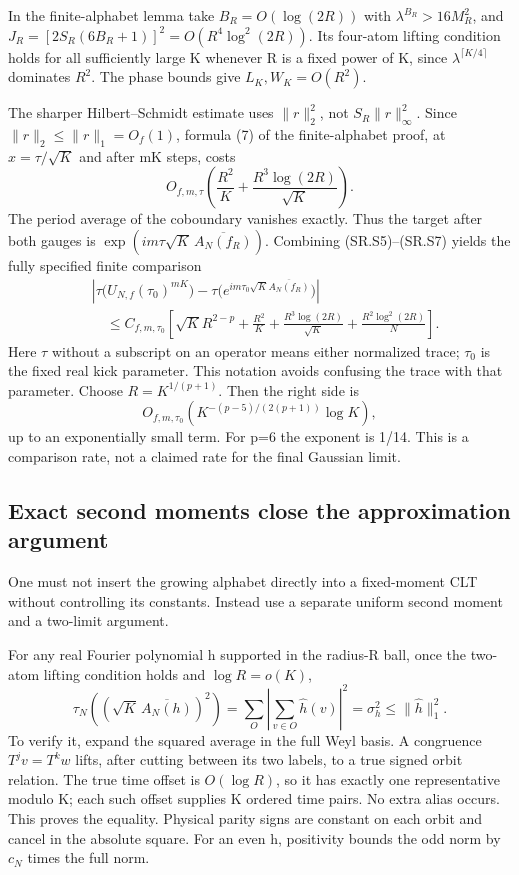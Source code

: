 In the finite-alphabet lemma take \(B_R=O(\log(2R))\) with \(\lambda^{B_R}>16M_R^2\), and \(J_R=[2S_R(6B_R+1)]^2=O(R^4\log^2(2R))\). Its four-atom lifting condition holds for all sufficiently large K whenever R is a fixed power of K, since \(\lambda^{\lceil K/4\rceil}\) dominates \(R^2\). The phase bounds give \(L_K,W_K=O(R^2)\).

The sharper Hilbert--Schmidt estimate uses \(\|r\|_2^2\), not \(S_R\|r\|_\infty^2\). Since \(\|r\|_2\leq\|r\|_1=O_f(1)\), formula (7) of the finite-alphabet proof, at \(x=\tau/\sqrt K\) and after mK steps, costs \[
 O_{f,m,\tau}\left(\frac{R^2}{K}+
                         \frac{R^3\log(2R)}{\sqrt K}\right). \tag{SR.S7}
\] The period average of the coboundary vanishes exactly. Thus the target after both gauges is \(\exp(i m\tau\sqrt K\,\overline {A_N(f_R)})\). Combining (SR.S5)--(SR.S7) yields the fully specified finite comparison \[
 \begin{split}
 &\left|\tau\bigl(U_{N,f}(\tau_0)^{mK}\bigr)
       -\tau\bigl(e^{im\tau_0\sqrt K\overline {A_N(f_R)}}\bigr)\right|\\
 &\quad\leq C_{f,m,\tau_0}\left[
 \sqrt K R^{2-p}+\frac{R^2}{K}+\frac{R^3\log(2R)}{\sqrt K}
                       +\frac{R^2\log^2(2R)}N\right].
 \end{split} \tag{SR.S8}
\] Here \(\tau\) without a subscript on an operator means either normalized trace; \(\tau_{0}\) is the fixed real kick parameter. This notation avoids confusing the trace with that parameter. Choose \(R=K^{1/(p+1)}\). Then the right side is \[
 O_{f,m,\tau_0}\left(K^{-(p-5)/(2(p+1))}\log K\right),         \tag{SR.S9}
\] up to an exponentially small term. For p=6 the exponent is 1/14. This is a comparison rate, not a claimed rate for the final Gaussian limit.

\subsection{Exact second moments close the approximation argument}\label{smooth:exact-second-moments-close-the-approximation-argument}

One must not insert the growing alphabet directly into a fixed-moment CLT without controlling its constants. Instead use a separate uniform second moment and a two-limit argument.

For any real Fourier polynomial h supported in the radius-R ball, once the two-atom lifting condition holds and \(\log R=o(K)\), \[
 \tau_N\left((\sqrt K\,\overline {A_N(h)})^2\right)
       =\sum_O\left|\sum_{v\in O}\widehat h(v)\right|^2
       =\sigma_h^2\leq\|\widehat h\|_1^2.                    \tag{SR.S10}
\] To verify it, expand the squared average in the full Weyl basis. A congruence \(T^jv=T^kw\) lifts, after cutting between its two labels, to a true signed orbit relation. The true time offset is \(O(\log R)\), so it has exactly one representative modulo K; each such offset supplies K ordered time pairs. No extra alias occurs. This proves the equality. Physical parity signs are constant on each orbit and cancel in the absolute square. For an even h, positivity bounds the odd norm by \(c_N\) times the full norm.

